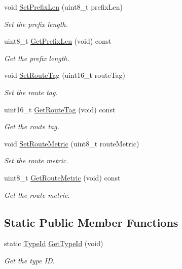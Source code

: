 \begin{DoxyCompactItemize}
void \hyperlink{classns3_1_1RipNgRte_a65d28fd1e776d13560da86d7a01f59a5}{Set\+Prefix\+Len} (uint8\+\_\+t prefix\+Len)
\begin{DoxyCompactList}\small\item\em Set the prefix length. \end{DoxyCompactList}\item 
uint8\+\_\+t \hyperlink{classns3_1_1RipNgRte_a333b49e121660692661227b02ab498db}{Get\+Prefix\+Len} (void) const 
\begin{DoxyCompactList}\small\item\em Get the prefix length. \end{DoxyCompactList}\item 
void \hyperlink{classns3_1_1RipNgRte_afb05e3f3cc1f2ce458f5c05474bff0b5}{Set\+Route\+Tag} (uint16\+\_\+t route\+Tag)
\begin{DoxyCompactList}\small\item\em Set the route tag. \end{DoxyCompactList}\item 
uint16\+\_\+t \hyperlink{classns3_1_1RipNgRte_a303fc6e5919ae85306deb1a65a252ae9}{Get\+Route\+Tag} (void) const 
\begin{DoxyCompactList}\small\item\em Get the route tag. \end{DoxyCompactList}\item 
void \hyperlink{classns3_1_1RipNgRte_a7e3642309fa1f99ba7b99bf646e32dd8}{Set\+Route\+Metric} (uint8\+\_\+t route\+Metric)
\begin{DoxyCompactList}\small\item\em Set the route metric. \end{DoxyCompactList}\item 
uint8\+\_\+t \hyperlink{classns3_1_1RipNgRte_a156555abac710858eae1e062fd8ab051}{Get\+Route\+Metric} (void) const 
\begin{DoxyCompactList}\small\item\em Get the route metric. \end{DoxyCompactList}\end{DoxyCompactItemize}
\subsection*{Static Public Member Functions}
\begin{DoxyCompactItemize}
\item 
static \hyperlink{classns3_1_1TypeId}{Type\+Id} \hyperlink{classns3_1_1RipNgRte_aaf20f2740231b6de0995397f1b570712}{Get\+Type\+Id} (void)
\begin{DoxyCompactList}\small\item\em Get the type ID. \end{DoxyCompactList}\end{DoxyCompactItemize}
